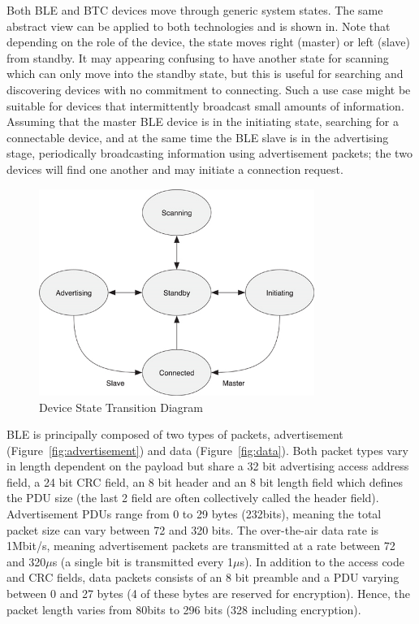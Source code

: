 \documentclass[]{article}
\begin{document}
Both BLE and BTC devices move through generic system states. The same abstract view can be applied to both technologies and is shown in. Note that depending on the role of the device, the state moves right (master) or left (slave) from standby. It may appearing confusing to have another state for scanning which can only move into the standby state, but this is useful for searching and discovering devices with no commitment to connecting. Such a use case might be suitable for devices that intermittently broadcast small amounts of information. Assuming that the master BLE device is in the initiating state, searching for a connectable device, and at the same time the BLE slave is in the advertising stage, periodically broadcasting information using advertisement packets; the two devices will find one another and may initiate a connection request.

\begin{figure}[h]
	\begin{center}
		\includegraphics[width = 0.8\textwidth]{systemstate}
	\end{center}
	\caption{Device State Transition Diagram}
	\label{fig:systemstate}
\end{figure}

\ac{BLE} is principally composed of two types of packets, advertisement (Figure~\ref{fig:advertisement}) and data (Figure~\ref{fig:data}). Both packet types vary in length dependent on the payload but share a 32 bit advertising access address field, a 24 bit \ac{CRC} field, an 8 bit header and an 8 bit length field which defines the \ac{PDU} size (the last 2 field are often collectively called the header field). Advertisement \ac{PDU}s range from 0 to 29 bytes (232bits), meaning the total packet size can vary between 72 and 320 bits. The over-the-air data rate is 1Mbit/s, meaning advertisement packets are transmitted at a rate between 72 and 320$\mu$s (a single bit is transmitted every 1$\mu$s). In addition to the access code and \ac{CRC} fields, data packets consists of an 8 bit preamble and a \ac{PDU} varying between 0 and 27 bytes (4 of these bytes are reserved for encryption). Hence, the packet length varies from 80bits to 296 bits (328 including encryption). 
\end{document}

